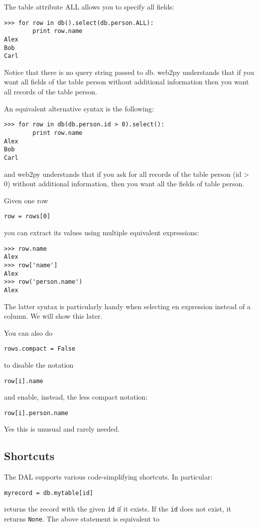 \documentclass[justified,sixbynine,notoc]{tufte-book}
\def\ft{\small\tt}
\def\inxx#1{\index{#1}}
\begin{document}
\begin{fullwidth}
The table attribute ALL allows you to specify all fields:
\begin{lstlisting}
>>> for row in db().select(db.person.ALL):
        print row.name
Alex
Bob
Carl
\end{lstlisting}

Notice that there is no query string passed to db. web2py understands that if you want all fields of the table person without additional information then you want all records of the table person.

An equivalent alternative syntax is the following:
\begin{lstlisting}
>>> for row in db(db.person.id > 0).select():
        print row.name
Alex
Bob
Carl
\end{lstlisting}
\noindent and web2py understands that if you ask for all records of the table person (id > 0) without additional information, then you want all the fields of table person.

Given one row

\begin{lstlisting}
row = rows[0]
\end{lstlisting}
\noindent you can extract its values using multiple equivalent expressions:

\begin{lstlisting}
>>> row.name
Alex
>>> row['name']
Alex
>>> row('person.name')
Alex
\end{lstlisting}

The latter syntax is particularly handy when selecting en expression instead of a column. We will show this later.

You can also do
\begin{lstlisting}
rows.compact = False
\end{lstlisting}
to disable the notation
\begin{lstlisting}
row[i].name
\end{lstlisting}
and enable, instead, the less compact notation:
\begin{lstlisting}
row[i].person.name
\end{lstlisting}
Yes this is unusual and rarely needed.

\goodbreak\subsection{Shortcuts}

\inxx{DAL shortcuts}

The DAL supports various code-simplifying shortcuts.
In particular:
\begin{lstlisting}
myrecord = db.mytable[id]
\end{lstlisting}
\noindent returns the record with the given {\ft id} if it exists. If the {\ft id} does not exist, it returns {\ft None}. The above statement is equivalent to


\end{fullwidth}
\end{document}
